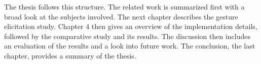 The thesis follows this structure. The related work is summarized first with a broad look at the subjects involved. The next chapter describes the gesture elicitation study. Chapter 4 then gives an overview of the implementation details, followed by the comparative study and its results. The discussion then includes an evaluation of the results and a look into future work. The conclusion, the last chapter, provides a summary of the thesis.


